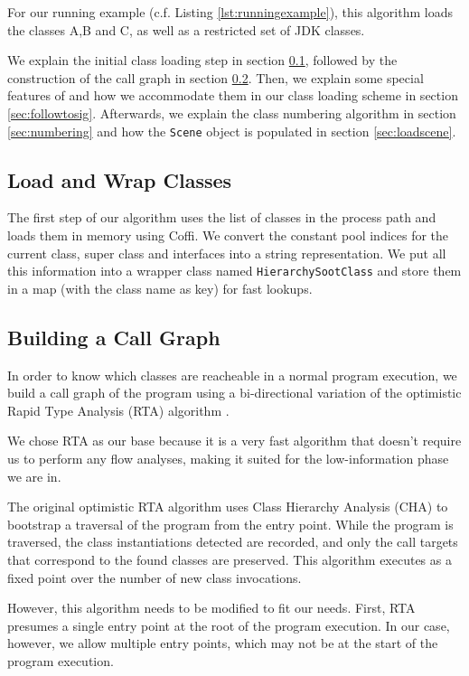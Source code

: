 \documentclass{sigplanconf}
\begin{document}
For our running example (c.f. Listing \ref{lst:runningexample}), this algorithm loads the classes A,B and C, as well as a restricted set of JDK classes. %

We explain the initial class loading step in section \ref{sec:loading}, followed by the construction of the call graph in section \ref{sec:cg}. Then, we explain some special features of \rb and how we accommodate them in our class loading scheme in section \ref{sec:followtosig}. Afterwards, we explain the class numbering algorithm in section \ref{sec:numbering} and how the {\tt Scene} object is populated in section \ref{sec:loadscene}.

\subsection{Load and Wrap Classes}
\label{sec:loading}
The first step of our algorithm uses the list of classes in the process path and loads them in memory using Coffi. We convert the constant pool indices for the current class, super class and interfaces into a string representation. We put all this information into a wrapper class named {\tt HierarchySootClass} and store them in a map (with the class name as key) for fast lookups.

\subsection{Building a Call Graph}
\label{sec:cg}
In order to know which classes are reacheable in a normal program execution, we build a call graph of the program using a bi-directional variation of the optimistic Rapid Type Analysis (RTA) algorithm \cite{BaconRTA, Sundaresan:2000:PVM:354222.353189}.

We chose RTA as our base because it is a very fast algorithm that doesn't require us to perform any flow analyses, making it suited for the low-information phase we are in.

The original optimistic RTA algorithm uses Class Hierarchy Analysis (CHA) \cite{deanetal} to bootstrap a traversal of the program from the entry point. While the program is traversed, the class instantiations detected are recorded, and only the call targets that correspond to the found classes are preserved. This algorithm executes as a fixed point over the number of new class invocations.

However, this algorithm needs to be modified to fit our needs. First, RTA presumes a single entry point at the root of the program execution. In our case, however, we allow multiple entry points, which may not be at the start of the program execution. %
\end{document}
